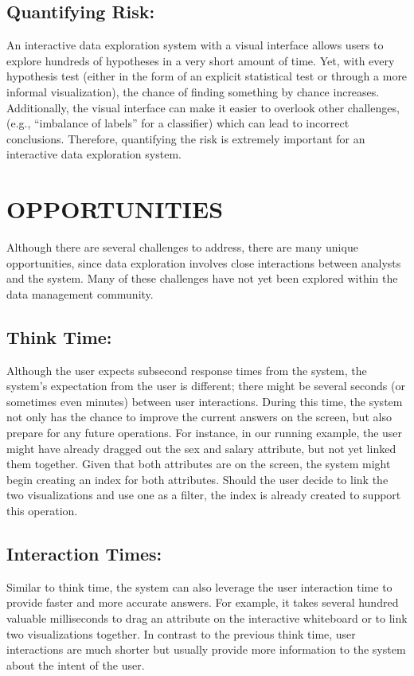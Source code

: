 \documentclass[12pt,letterpaper, onecolumn]{exam}
\begin{document}
    \subsection{Quantifying Risk:}
    An interactive data exploration system with a visual interface allows users to explore hundreds of hypotheses in a very short amount of time. Yet, with every hypothesis test (either in the form of an explicit statistical test or through a more informal visualization), the chance of finding something by chance increases. Additionally, the visual interface can make it easier to overlook other challenges, (e.g., “imbalance of labels” for a classifier) which can lead to incorrect conclusions. Therefore, quantifying the risk is extremely important for an interactive data exploration system.
    
    \section{OPPORTUNITIES}
    Although there are several challenges to address, there are many unique opportunities, since data exploration involves close interactions between analysts and the system. Many of these challenges have not yet been explored within the data management community.
    
    \subsection{Think Time:}
    Although the user expects subsecond response times from the system, the system’s expectation from the user is different; there might be several seconds (or sometimes even minutes) between user interactions. During this time, the system not only has the chance to improve the current answers on the screen, but also prepare for any future operations. For instance, in our running example, the user might have already dragged out the sex and salary attribute, but not yet linked them together. Given that both attributes are on the screen, the system might begin creating an index for both attributes. Should the user decide to link the two visualizations and use one as a filter, the index is already created to support this operation.
    \subsection{Interaction Times:} 
    Similar to think time, the system can also leverage the user interaction time to provide faster and more accurate answers. For example, it takes several hundred valuable milliseconds to drag an attribute on the interactive whiteboard or to link two visualizations together. In contrast to the previous think time, user interactions are much shorter but usually provide more information to the system about the intent of the user.
    
\end{document}
